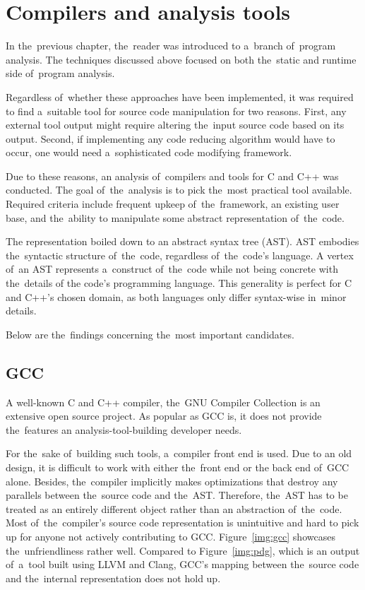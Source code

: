 \chapter{Compilers and analysis tools}\label{chap:tools}

In the~previous chapter, the~reader was introduced to a~branch of~program
ana\-ly\-sis. 
The techniques discussed above focused on both the~static and runtime
side of~program analysis. 

Regardless of~whether these approaches have been implemented, it was 
required to find a~suitable tool for source code manipulation for two reasons. 
First, any external tool output might require altering the~input source code 
based on its output. 
Second, if implementing any code reducing algorithm would have to occur, 
one would need a~sophisticated code modifying framework. 

Due to these reasons, an analysis of~compilers and tools for C and C++ was conducted. 
The goal of~the~analysis is to pick the~most practical tool available. 
Required criteria include frequent upkeep of~the~framework, 
an existing user base, and the~ability to manipulate some abstract 
representation of~the~code.

The representation boiled down to an abstract syntax tree (AST). 
AST embodies the~syntactic structure of~the~code, regardless of~the~code's language. 
A vertex of~an AST represents a~construct of~the~code while not being concrete 
with the~details of the code's programming language. 
This generality is perfect for C and C++'s chosen domain, 
as both languages only differ syntax-wise in~minor details.

Below are the~findings concerning the~most important candidates.

\section{GCC}

A well-known C and C++ compiler, the~GNU Compiler Collection \citep{gcc:online} 
is an extensive
open source project. 
As popular as GCC is, it does not provide the~features an analysis-tool-building 
developer needs. 

For the~sake of~building such tools, a~compiler front end is used. 
Due to an old design, it is difficult to work with either the~front end or 
the back end of~GCC alone. 
Besides, the~compiler implicitly makes optimizations that destroy any parallels 
between the~source code and the~AST. 
Therefore, the~AST has to be treated as an entirely different object rather than 
an abstraction of~the~code. 
Most of~the~compiler's source code representation is unintuitive and 
hard to pick up for anyone not actively contributing to GCC. 
Figure~\ref{img:gcc} showcases the~unfriendliness rather well.
Compared to Figure~\ref{img:pdg}, which is an output of~a~tool built using
LLVM and Clang, GCC's mapping between the~source code and the~internal
representation does not hold up.

